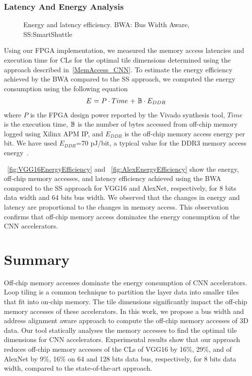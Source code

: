 \subsubsection{Latency And Energy Analysis}
\begin{figure}[htb]
	\centering
	\hfil
	\hfil
	\caption{Energy and latency efficiency. BWA: Bus Width Aware, SS:SmartShuttle}
	\label{fig:EffectOnLatency}
	\vspace{-1.0em}
\end{figure}
Using our FPGA implementation, we measured the memory access latencies and execution time for CLs for the optimal tile dimensions determined using the approach described in~\ref{MemAccess_CNN}. To estimate the energy efficiency achieved by the BWA compared to the SS approach, we computed the energy consumption using the following equation~\cite{tu2017deep}
\begin{align}\label{eq:energyEfficiency}
	E~{=}~P\cdot Time~{+}~\mathbb{B}\cdot E_{DDR}
\end{align}
where $P$ is the FPGA design power reported by the Vivado synthesis tool, $Time$ is the execution time, $\mathbb{B}$ is the number of bytes accessed from off-chip memory logged using Xilinx APM IP, and $E_{DDR}$ is the off-chip memory access energy per bit. We have used $E_{DDR}$=70 pJ/bit, a typical value for the DDR3 memory access energy~\cite{6237004}.

\figurename{~\ref{fig:VGG16EnergyEfficiency}} and \figurename{~\ref{fig:AlexEnergyEfficiency}} show the energy, off-chip memory accesses, and latency efficiency achieved using the BWA compared to the SS approach for VGG16 and AlexNet, respectively, for 8 bits data width and 64 bits bus width. We observed that the changes in energy and latency are proportional to the changes in memory access. This observation confirms that off-chip memory access dominates the energy consumption of the CNN accelerators. 
\section{Summary}
Off-chip memory accesses dominate the energy consumption of CNN accelerators. Loop tiling is a common technique to partition the layer data into smaller tiles that fit into on-chip memory. The tile dimensions significantly impact the off-chip memory accesses of these accelerators. In this work, we propose a bus width and address alignment aware approach to compute the off-chip memory accesses of 3D data. Our tool statically analyses the memory accesses to find the optimal tile dimensions for CNN accelerators. Experimental results show that our approach reduces off-chip memory accesses of the CLs of VGG16 by 16\%, 29\%, and of AlexNet by 9\%, 16\% on 64 and 128 bits data bus, respectively, for 8 bits data width, compared to the state-of-the-art approach.